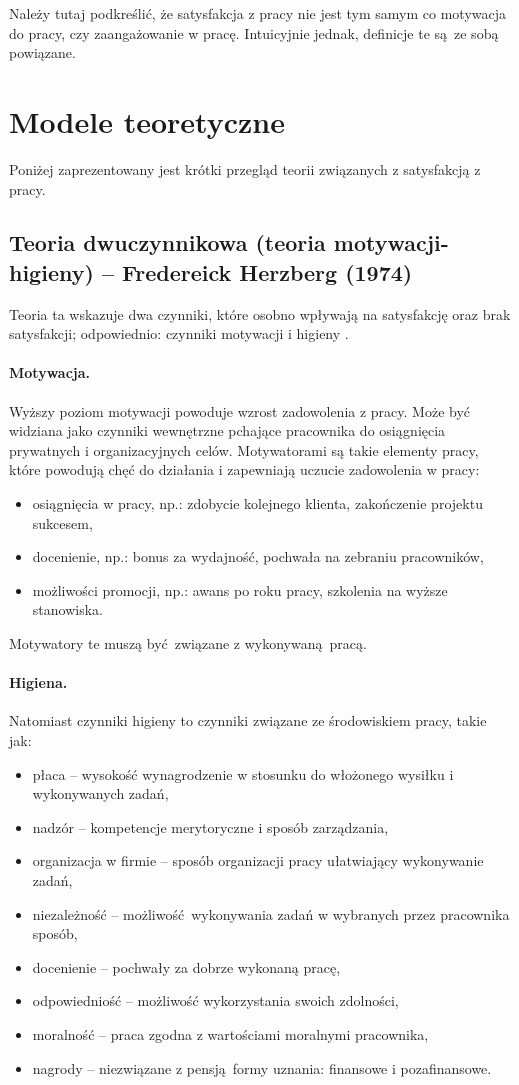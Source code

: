 Należy tutaj podkreślić, że satysfakcja z pracy nie jest tym samym co motywacja do pracy, czy zaangażowanie w pracę. Intuicyjnie jednak, definicje te są ze sobą powiązane.

\section{Modele teoretyczne}
Poniżej zaprezentowany jest krótki przegląd teorii związanych z satysfakcją z pracy.

\subsection{Teoria dwuczynnikowa (teoria motywacji-higieny) -- Fredereick Herzberg (1974)}
\label{sec:theory-sat-herz}
Teoria ta wskazuje dwa czynniki, które osobno wpływają na satysfakcję oraz brak satysfakcji; odpowiednio: czynniki motywacji i higieny \cite{herzberg1974motivation}. 

\paragraph{Motywacja.} Wyższy poziom motywacji powoduje wzrost zadowolenia z pracy. Może być widziana jako czynniki wewnętrzne pchające pracownika do osiągnięcia prywatnych i organizacyjnych celów. Motywatorami są takie elementy pracy, które powodują chęć do działania i zapewniają uczucie zadowolenia w pracy:
\begin{itemize}
\item osiągnięcia w pracy, np.: zdobycie kolejnego klienta, zakończenie projektu sukcesem,
\item docenienie, np.: bonus za wydajność, pochwała na zebraniu pracowników,
\item możliwości promocji, np.: awans po roku pracy, szkolenia na wyższe stanowiska.
\end{itemize}
Motywatory te muszą być związane z wykonywaną pracą.

\paragraph{Higiena.} Natomiast czynniki higieny to czynniki związane ze środowiskiem pracy, takie jak:
\begin{itemize}
\item płaca -- wysokość wynagrodzenie w stosunku do włożonego wysiłku i wykonywanych zadań, 
\item nadzór -- kompetencje merytoryczne i sposób zarządzania,
\item organizacja w firmie -- sposób organizacji pracy ułatwiający wykonywanie zadań, 
\item niezależność -- możliwość wykonywania zadań w wybranych przez pracownika sposób,
\item docenienie -- pochwały za dobrze wykonaną pracę,
\item odpowiedniość -- możliwość wykorzystania swoich zdolności,
\item moralność -- praca zgodna z wartościami moralnymi pracownika,
\item nagrody -- niezwiązane z pensją formy uznania: finansowe i pozafinansowe.
\end{itemize}

